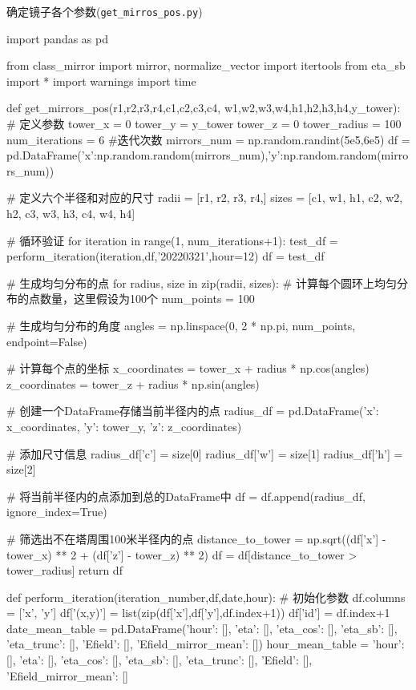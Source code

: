 \documentclass{article}
\numberwithin{equation}{subsection}
\begin{document}
确定镜子各个参数(\verb|get_mirros_pos.py|)
\begin{python}
import pandas as pd

from class_mirror import mirror, normalize_vector
import itertools
from eta_sb import *
import warnings
import time

def get_mirrors_pos(r1,r2,r3,r4,c1,c2,c3,c4,
                       w1,w2,w3,w4,h1,h2,h3,h4,y_tower):
    # 定义参数
    tower_x = 0
    tower_y = y_tower
    tower_z = 0
    tower_radius = 100
    num_iterations = 6 #迭代次数
    mirrors_num = np.random.randint(5e5,6e5)
    df = pd.DataFrame({'x':np.random.random(mirrors_num),'y':np.random.random(mirrors_num)})

    # 定义六个半径和对应的尺寸
    radii = [r1, r2, r3, r4,]
    sizes = [c1, w1, h1, c2, w2, h2, c3, w3, h3, c4, w4, h4]

    # 循环验证
    for iteration in range(1, num_iterations+1):
        test_df = perform_iteration(iteration,df,'20220321',hour=12)
    df = test_df

    # 生成均匀分布的点
    for radius, size in zip(radii, sizes):
        # 计算每个圆环上均匀分布的点数量，这里假设为100个
        num_points = 100

        # 生成均匀分布的角度
        angles = np.linspace(0, 2 * np.pi, num_points, endpoint=False)

        # 计算每个点的坐标
        x_coordinates = tower_x + radius * np.cos(angles)
        z_coordinates = tower_z + radius * np.sin(angles)

        # 创建一个DataFrame存储当前半径内的点
        radius_df = pd.DataFrame({'x': x_coordinates, 'y': tower_y, 'z': z_coordinates})

        # 添加尺寸信息
        radius_df['c'] = size[0]
        radius_df['w'] = size[1]
        radius_df['h'] = size[2]

        # 将当前半径内的点添加到总的DataFrame中
        df = df.append(radius_df, ignore_index=True)

    # 筛选出不在塔周围100米半径内的点
    distance_to_tower = np.sqrt((df['x'] - tower_x) ** 2 + (df['z'] - tower_z) ** 2)
    df = df[distance_to_tower > tower_radius]
    return df

def perform_iteration(iteration_number,df,date,hour):
    # 初始化参数
    df.columns = ['x', 'y']
    df['(x,y)'] = list(zip(df['x'],df['y'],df.index+1))
    df['id'] = df.index+1
    date_mean_table = pd.DataFrame({'hour': [], 'eta': [], 'eta_cos': [], 'eta_sb': [], 'eta_trunc': [], 'Efield': [], 'Efield_mirror_mean': []})
    hour_mean_table = {'hour': [], 'eta': [], 'eta_cos': [], 'eta_sb': [], 'eta_trunc': [], 'Efield': [],
                       'Efield_mirror_mean': []}


\end{python}
\end{document}
